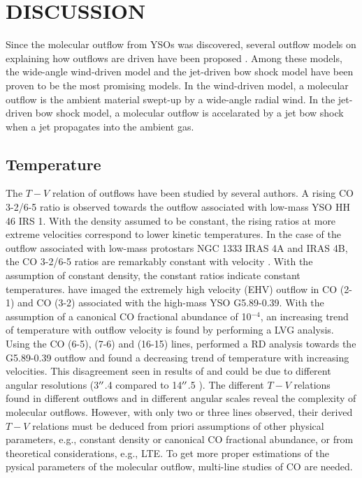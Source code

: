 \section{DISCUSSION}\label{discussion}
Since the molecular outflow from YSOs was discovered, several outflow models on explaining how outflows are driven have been proposed \citep{2007prpl.conf..245A}. Among these models, the wide-angle wind-driven model \citep{1991ApJ...370L..31S,1996ApJ...472..211L, 2001ApJ...557..429L} and the jet-driven bow shock model \citep{ 1993A&A...278..267R, 1993ApJ...414..230M, 2001ApJ...557..429L} have been proven to be the most promising models.
In the wind-driven model, a molecular outflow is the ambient material swept-up by a wide-angle radial wind. In the jet-driven bow shock model, a molecular outflow is accelarated by a jet bow shock when a jet propagates into the ambient gas.

\subsection{Temperature}


The $T-V$ relation of outflows have been studied by several authors.  A rising CO 3-2/6-5 ratio is observed towards the outflow associated with low-mass YSO HH 46 IRS 1\citep{2009A&A...501..633V}. With the density assumed to be constant, the rising ratios at more extreme velocities correspond to lower kinetic temperatures. In the case of the outflow associated with low-mass protostars NGC 1333 IRAS 4A and  IRAS 4B, the CO 3-2/6-5 ratios are remarkably constant with velocity \citep{2012A&A...542A..86Y}. With the assumption of constant density, the constant ratios indicate constant temperatures. \citet{2012ApJ...744L..26S} have imaged the extremely high velocity (EHV) outflow in CO (2-1) and CO (3-2) associated with the high-mass YSO G5.89-0.39. With the assumption of a canonical CO fractional abundance of 10$^{-4}$, an increasing trend of temperature with outflow velocity is found by performing a LVG analysis. Using the CO (6-5), (7-6) and (16-15) lines, \citet{2015A&A...584A..70L} performed a RD analysis towards the G5.89-0.39 outflow and found a decreasing trend of temperature with increasing velocities. This disagreement seen in results of \citet{2012ApJ...744L..26S} and \citet{2015A&A...584A..70L} could be due to different angular resolutions (3${\mbox{$^{\prime\prime}$}}$.4 compared to 14${\mbox{$^{\prime\prime}$}}$.5 ). The different $T-V$ relations found in different outflows and in different angular scales reveal the complexity of molecular outflows. However, with only two or three lines observed, their derived $T-V$ relations must be deduced from priori assumptions of other physical parameters, e.g., constant density or canonical CO fractional abundance, or from theoretical considerations, e.g., LTE. To get more proper estimations of the pysical parameters of the molecular outflow, multi-line studies of CO are needed.

